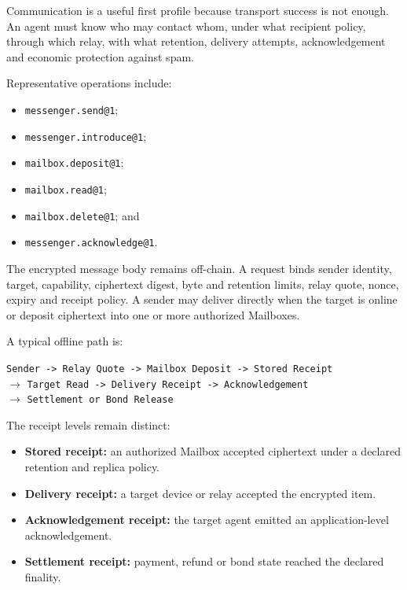\documentclass[11pt,oneside]{article}
\newcommand{\opid}[1]{\texttt{#1}}
\begin{document}
Communication is a useful first profile because transport success is not enough. An agent
must know who may contact whom, under what recipient policy, through which relay, with what
retention, delivery attempts, acknowledgement and economic protection against spam.

Representative operations include:

\begin{itemize}
  \item \opid{messenger.send@1};
  \item \opid{messenger.introduce@1};
  \item \opid{mailbox.deposit@1};
  \item \opid{mailbox.read@1};
  \item \opid{mailbox.delete@1}; and
  \item \opid{messenger.acknowledge@1}.
\end{itemize}

The encrypted message body remains off-chain. A request binds sender identity, target,
capability, ciphertext digest, byte and retention limits, relay quote, nonce, expiry and
receipt policy. A sender may deliver directly when the target is online or deposit ciphertext
into one or more authorized Mailboxes.

A typical offline path is:

\begin{center}
\texttt{Sender -> Relay Quote -> Mailbox Deposit -> Stored Receipt}\\
$\longrightarrow$ \texttt{Target Read -> Delivery Receipt -> Acknowledgement}\\
$\longrightarrow$ \texttt{Settlement or Bond Release}
\end{center}

The receipt levels remain distinct:

\begin{itemize}
  \item \textbf{Stored receipt:} an authorized Mailbox accepted ciphertext under a declared
        retention and replica policy.
  \item \textbf{Delivery receipt:} a target device or relay accepted the encrypted item.
  \item \textbf{Acknowledgement receipt:} the target agent emitted an application-level
        acknowledgement.
  \item \textbf{Settlement receipt:} payment, refund or bond state reached the declared
        finality.
\end{itemize}
\end{document}
